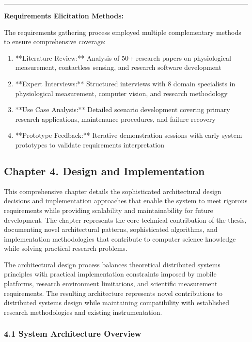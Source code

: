 \documentclass[12pt,a4paper]{report}
\begin{document}
\hrule

\textbf{Requirements Elicitation Methods:}

The requirements gathering process employed multiple complementary methods to ensure comprehensive coverage:

\begin{enumerate}
\item **Literature Review:** Analysis of 50+ research papers on physiological measurement, contactless sensing, and
   research software development
\item **Expert Interviews:** Structured interviews with 8 domain specialists in physiological measurement, computer vision,
   and research methodology
\item **Use Case Analysis:** Detailed scenario development covering primary research applications, maintenance procedures,
   and failure recovery
\item **Prototype Feedback:** Iterative demonstration sessions with early system prototypes to validate requirements
   interpretation

\end{enumerate}
\subsection{Chapter 4. Design and Implementation}

This comprehensive chapter details the sophisticated architectural design decisions and implementation approaches that
enable the system to meet rigorous requirements while providing scalability and maintainability for future development.
The chapter represents the core technical contribution of the thesis, documenting novel architectural patterns,
sophisticated algorithms, and implementation methodologies that contribute to computer science knowledge while solving
practical research problems.

The architectural design process balances theoretical distributed systems principles with practical implementation
constraints imposed by mobile platforms, research environment limitations, and scientific measurement requirements. The
resulting architecture represents novel contributions to distributed systems design while maintaining compatibility with
established research methodologies and existing instrumentation.

\subsubsection{4.1 System Architecture Overview}
\end{document}
